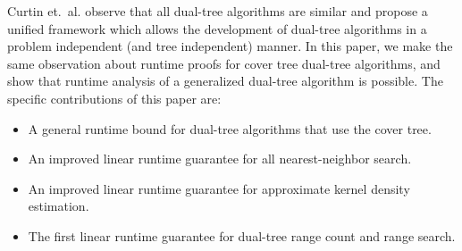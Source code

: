 \documentclass{article} %
\begin{document}
%
%
%
%
Curtin et.~al. \cite{curtin2013tree} observe that all dual-tree
algorithms are similar and propose a unified framework which allows the
development of dual-tree algorithms in a problem independent (and tree
independent) manner. In this paper, we make the same observation about runtime
proofs for cover tree dual-tree algorithms, and show that runtime analysis
of a generalized dual-tree algorithm is possible. The specific contributions of
this paper are:
\vspace*{-0.3em}
\begin{itemize}
  \item A general runtime bound for dual-tree algorithms that use the cover
tree.
  \item An improved linear runtime guarantee for all nearest-neighbor search.
  \item An improved linear runtime guarantee for approximate kernel density
estimation.
  \item The first linear runtime guarantee for dual-tree range count and range
search.
\end{itemize}
\end{document}
